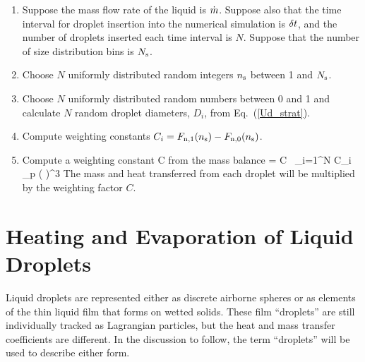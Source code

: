 \begin{enumerate}
\item Suppose the mass flow rate of the liquid is $\dot{m}$. Suppose also that the time interval for droplet insertion into the numerical simulation is $\delta t$, and the number of droplets inserted each time interval is $N$. Suppose that the number of size distribution bins is $N_{\rm s}$.
\item Choose $N$ uniformly distributed random integers $n_{\rm s}$ between 1 and $N_{\rm s}$.
\item Choose $N$ uniformly distributed random numbers between 0 and 1 and calculate $N$ random droplet diameters, $D_i$, from Eq.~(\ref{Ud_strat}).
\item Compute weighting constants $C_i = F_{\rm n,1}(n_{\rm s}) - F_{\rm n,0}(n_{\rm s})$.
\item Compute a weighting constant C from the mass balance
    \be \dm \; \dt = C \, \sum_{i=1}^N \; C_i \;  \pi \rho_{\rm p}
      \left(  \right)^3
    \ee
    The mass and heat transferred from each droplet will be multiplied by the weighting factor $C$.
\end{enumerate}


\section{Heating and Evaporation of Liquid Droplets}

Liquid droplets are represented either as discrete airborne spheres or as elements of the thin liquid film that forms on wetted solids. These film ``droplets'' are still individually tracked as Lagrangian particles, but the heat and mass transfer coefficients are different. In the discussion to follow, the term ``droplets'' will be used to describe either form.

